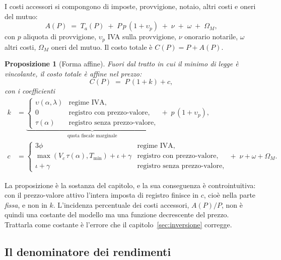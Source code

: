\documentclass[11pt,a4paper]{article}
\theoremstyle{definition}
\theoremstyle{plain}
\newtheorem{proposizione}[definizione]{Proposizione}
\begin{document}
I costi accessori si compongono di imposte, provvigione, notaio, altri costi e oneri del mutuo:
\begin{equation}
A(P) \;=\; T_a(P) \;+\; P\,p\,(1+\upsilon_p) \;+\; \nu \;+\; \omega \;+\; \Omega_M,
\label{eq:accessori}
\end{equation}
con $p$ aliquota di provvigione, $\upsilon_p$ IVA sulla provvigione, $\nu$ onorario notarile, $\omega$ altri costi, $\Omega_M$ oneri del mutuo. Il costo totale è $C(P) = P + A(P)$.

\begin{proposizione}[Forma affine]
Fuori dal tratto in cui il minimo di legge è vincolante, il costo totale è affine nel prezzo:
\begin{equation}
C(P) \;=\; P\,(1+k) + c,
\label{eq:costo-affine}
\end{equation}
con i coefficienti
\begin{align}
k &= \underbrace{\begin{cases}
\upsilon(\alpha,\lambda) & \text{regime IVA},\\
0 & \text{registro con prezzo-valore},\\
\tau(\alpha) & \text{registro senza prezzo-valore},
\end{cases}}_{\text{quota fiscale marginale}}
\;+\; p\,(1+\upsilon_p),
\label{eq:k}\\[0.6em]
c &= \begin{cases}
3\phi & \text{regime IVA},\\
\max(V_c\,\tau(\alpha), T_{\min}) + \iota + \gamma & \text{registro con prezzo-valore},\\
\iota + \gamma & \text{registro senza prezzo-valore},
\end{cases}
\;+\; \nu + \omega + \Omega_M .
\label{eq:c}
\end{align}
\end{proposizione}

La proposizione è la sostanza del capitolo, e la sua conseguenza è controintuitiva: con il prezzo-valore attivo l'intera imposta di registro finisce in $c$, cioè nella parte \emph{fissa}, e non in $k$. L'incidenza percentuale dei costi accessori, $A(P)/P$, non è quindi una costante del modello ma una funzione decrescente del prezzo. Trattarla come costante è l'errore che il capitolo~\ref{sec:inversione} corregge.

\subsection{Il denominatore dei rendimenti}
\end{document}
